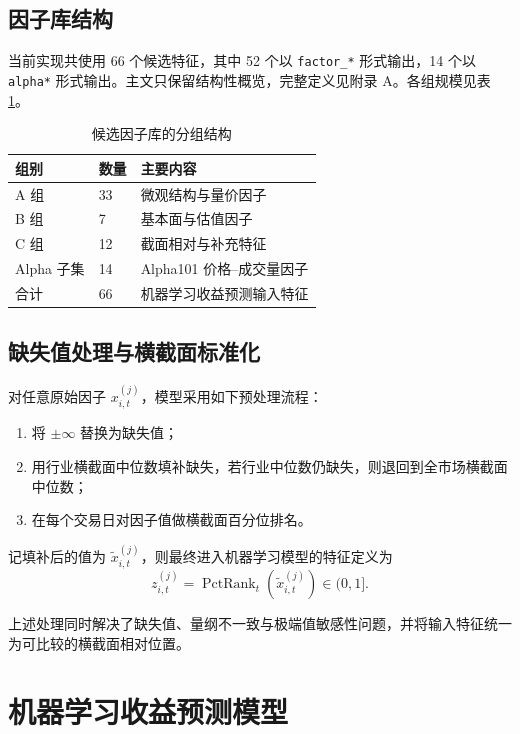 \documentclass[12pt, a4paper, oneside]{article}
\begin{document}
\subsection{因子库结构}

当前实现共使用 66 个候选特征，其中 52 个以 \texttt{factor\_*} 形式输出，14 个以 \texttt{alpha*} 形式输出。主文只保留结构性概览，完整定义见附录 A。各组规模见表 \ref{tab:factor-groups}。

\begin{table}[H]
\centering
\caption{候选因子库的分组结构}
\label{tab:factor-groups}
\begin{tabular}{lll}
\toprule
组别 & 数量 & 主要内容 \\
\midrule
A 组 & 33 & 微观结构与量价因子 \\
B 组 & 7  & 基本面与估值因子 \\
C 组 & 12 & 截面相对与补充特征 \\
Alpha 子集 & 14 & Alpha101 价格--成交量因子 \\
\midrule
合计 & 66 & 机器学习收益预测输入特征 \\
\bottomrule
\end{tabular}
\end{table}

\subsection{缺失值处理与横截面标准化}

对任意原始因子 \(x_{i,t}^{(j)}\)，模型采用如下预处理流程：
\begin{enumerate}[label=\arabic*)]
    \item 将 \(\pm\infty\) 替换为缺失值；
    \item 用行业横截面中位数填补缺失，若行业中位数仍缺失，则退回到全市场横截面中位数；
    \item 在每个交易日对因子值做横截面百分位排名。
\end{enumerate}

记填补后的值为 \(\tilde x_{i,t}^{(j)}\)，则最终进入机器学习模型的特征定义为
\begin{equation}
z_{i,t}^{(j)} = \operatorname{PctRank}_t\!\left(\tilde x_{i,t}^{(j)}\right) \in (0,1].
\end{equation}

上述处理同时解决了缺失值、量纲不一致与极端值敏感性问题，并将输入特征统一为可比较的横截面相对位置。

\section{机器学习收益预测模型}
\end{document}
